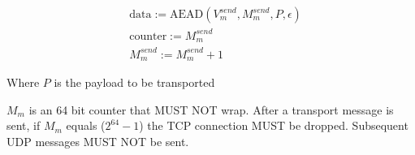 \begin{align*}
    & \text{data} := \text{AEAD}(V_{m}^{send}, M_{m}^{send}, P, \epsilon)\\
    & \text{counter} := M_{m}^{send}\\
    & M_{m}^{send} := M_{m}^{send} + 1
\end{align*}


Where $P$ is the payload to be transported

$M_{m}$ is an 64 bit counter that MUST NOT wrap. After a transport message is sent, if $M_{m}$ equals
($2^{64}-1$) the TCP connection MUST be dropped. Subsequent UDP messages MUST NOT be sent. \\

